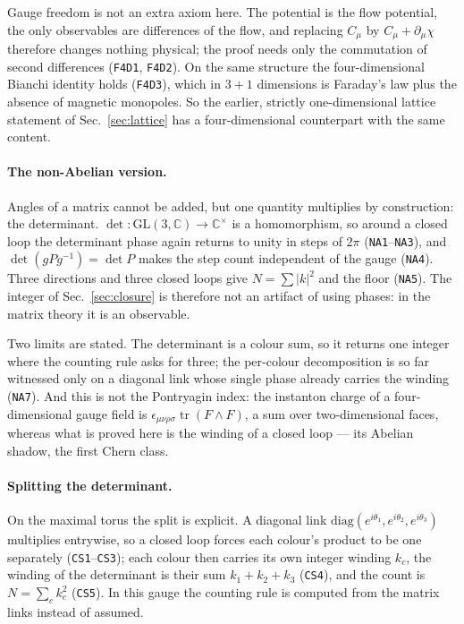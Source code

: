 \documentclass[aps,prd,preprint,superscriptaddress,amsmath,amssymb]{revtex4-2}
\begin{document}
Gauge freedom is not an extra axiom here.  The potential is the flow
potential, the only observables are differences of the flow, and replacing
$C_\mu$ by $C_\mu+\partial_\mu\chi$ therefore changes nothing physical; the
proof needs only the commutation of second differences (\texttt{F4D1},
\texttt{F4D2}).  On the same structure the four-dimensional Bianchi identity
holds (\texttt{F4D3}), which in $3+1$ dimensions is Faraday's law plus the
absence of magnetic monopoles.  So the earlier, strictly one-dimensional
lattice statement of Sec.~\ref{sec:lattice} has a four-dimensional
counterpart with the same content.

\paragraph{The non-Abelian version.}
Angles of a matrix cannot be added, but one quantity multiplies by
construction: the determinant.  $\det:\mathrm{GL}(3,\mathbb{C})\to\mathbb{C}^{\times}$
is a homomorphism, so around a closed loop the determinant phase again
returns to unity in steps of $2\pi$ (\texttt{NA1}--\texttt{NA3}), and
$\det(gPg^{-1})=\det P$ makes the step count independent of the gauge
(\texttt{NA4}).  Three directions and three closed loops give
$N=\sum|k|^2$ and the floor (\texttt{NA5}).  The integer of
Sec.~\ref{sec:closure} is therefore not an artifact of using phases: in the
matrix theory it is an observable.

Two limits are stated.  The determinant is a colour sum, so it returns one
integer where the counting rule asks for three; the per-colour
decomposition is so far witnessed only on a diagonal link whose single
phase already carries the winding (\texttt{NA7}).  And this is not the
Pontryagin index: the instanton charge of a four-dimensional gauge field is
$\epsilon_{\mu\nu\rho\sigma}\operatorname{tr}(F\wedge F)$, a sum over
two-dimensional faces, whereas what is proved here is the winding of a
closed loop --- its Abelian shadow, the first Chern class.

\paragraph{Splitting the determinant.}
On the maximal torus the split is explicit.  A diagonal link
$\mathrm{diag}(e^{i\theta_1},e^{i\theta_2},e^{i\theta_3})$ multiplies
entrywise, so a closed loop forces each colour's product to be one
separately (\texttt{CS1}--\texttt{CS3}); each colour then carries its own
integer winding $k_c$, the winding of the determinant is their sum
$k_1+k_2+k_3$ (\texttt{CS4}), and the count is $N=\sum_c k_c^2$
(\texttt{CS5}).  In this gauge the counting rule is computed from the
matrix links instead of assumed.
\end{document}
